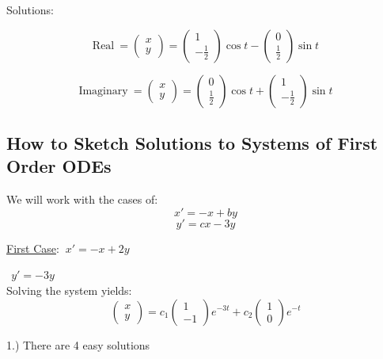 \documentclass[12pt]{article}
\numberwithin{equation}{subsection}
\newcommand{\indb}{\hspace{1cm}}
\newcommand{\indd}{\hspace{2cm}}
\begin{document}
Solutions:

$$\textrm{Real}\ = \begin{pmatrix}
x \\
y
\end{pmatrix}=\begin{pmatrix}
1 \\
-\frac{1}{2}
\end{pmatrix}\cos t - \begin{pmatrix}
0 \\
\frac{1}{2}
\end{pmatrix}\sin t  $$

$$\textrm{Imaginary}\ = \begin{pmatrix}
x \\
y
\end{pmatrix}=\begin{pmatrix}
0 \\
\frac{1}{2}
\end{pmatrix}\cos t + \begin{pmatrix}
1 \\
-\frac{1}{2}
\end{pmatrix}\sin t  $$

\newpage
\subsection{How to Sketch Solutions to Systems of First Order ODEs}
We will work with the cases of:
\begin{equation}
x'=-x+by
\end{equation}
\begin{equation}
y'=cx-3y
\end{equation}

\bigskip 

\underline{First Case}: $\ x'=-x+2y$

\indd $\ \  y'=-3y$\\

Solving the system yields:
$$ \begin{pmatrix}
x \\ y
\end{pmatrix}=c_1\begin{pmatrix}
1 \\ -1
\end{pmatrix}e^{-3t}+c_2\begin{pmatrix}
1 \\ 0
\end{pmatrix}e^{-t}$$

\indb 1.) There are 4 easy solutions
\end{document}
